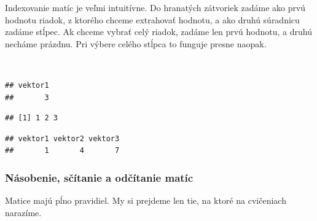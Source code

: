 Indexovanie matíc je veľmi intuitívne. Do hranatých zátvoriek zadáme ako
prvú hodnotu riadok, z ktorého chceme extrahovať hodnotu, a ako druhú
súradnicu zadáme stĺpec. Ak chceme vybrať celý riadok, zadáme len prvú
hodnotu, a druhú necháme prázdnu. Pri výbere celého stĺpca to funguje
presne naopak.

~

\begin{Shaded}
\begin{Highlighting}[]

\NormalTok{matica_riadky[}\NormalTok{, }\NormalTok{] }
\end{Highlighting}
\end{Shaded}

\begin{verbatim}
## vektor1 
##       3
\end{verbatim}

\begin{Shaded}
\begin{Highlighting}[]
\NormalTok{matica_riadky[}\NormalTok{, ] }
\end{Highlighting}
\end{Shaded}

\begin{verbatim}
## [1] 1 2 3
\end{verbatim}

\begin{Shaded}
\begin{Highlighting}[]
\NormalTok{matica_riadky[ , }\NormalTok{] }
\end{Highlighting}
\end{Shaded}

\begin{verbatim}
## vektor1 vektor2 vektor3 
##       1       4       7
\end{verbatim}

\hypertarget{nuxe1sobenie-sux10duxedtanie-a-odux10duxedtanie-matuxedc}{%
\subsubsection{Násobenie, sčítanie a odčítanie
matíc}\label{nuxe1sobenie-sux10duxedtanie-a-odux10duxedtanie-matuxedc}}

Matice majú pĺno pravidiel. My si prejdeme len tie, na ktoré na
cvičeniach narazíme.

